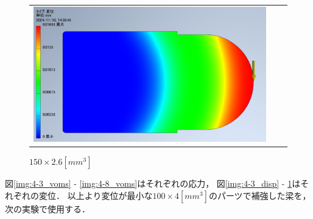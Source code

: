 \begin{figure}[H]
\begin{tabular}{ccc}
\begin{minipage}{.25\textwidth}
        \caption{$120\times3.3[mm^3]$}
        \label{img:4-7_disp}
      \end{minipage}
      \begin{minipage}{.25\textwidth}
        \centering
        \includegraphics[width=0.99\linewidth]{images/4-8_disp.png}
        \caption{$150\times2.6[mm^3]$}
        \label{img:4-8_disp}
      \end{minipage}
    \end{tabular}
  \end{figure}

  図\ref{img:4-3_voms} - \ref{img:4-8_voms}はそれぞれの応力，
  図\ref{img:4-3_disp} - \ref{img:4-8_disp}はそれぞれの変位．
  以上より変位が最小な$100 \times 4[mm^3]$のパーツで補強した梁を，次の実験で使用する．

